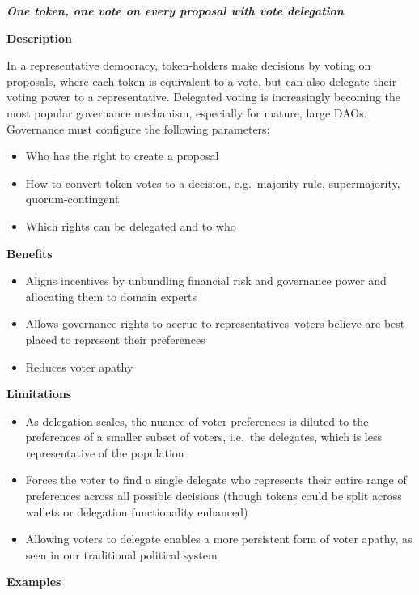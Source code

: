 \documentclass[
]{article}
\providecommand{\tightlist}{%
  \setlength{\itemsep}{0pt}\setlength{\parskip}{0pt}}
\begin{document}
\textbf{\emph{One token, one vote on every proposal with vote
delegation}}

\textbf{Description}

In a representative democracy, token-holders make decisions by voting on
proposals, where each token is equivalent to a vote, but can also
delegate their voting power to a representative. Delegated voting is
increasingly becoming the most popular governance mechanism, especially
for mature, large DAOs. Governance must configure the following
parameters:

\begin{itemize}
\tightlist
\item
  Who has the right to create a proposal
\item
  How to convert token votes to a decision, e.g.~majority-rule,
  supermajority, quorum-contingent
\item
  Which rights can be delegated and to who
\end{itemize}

\textbf{Benefits}

\begin{itemize}
\tightlist
\item
  Aligns incentives by unbundling financial risk and governance power
  and allocating them to domain experts
\item
  Allows governance rights to accrue to representatives~voters believe
  are best placed to represent their preferences
\item
  Reduces voter apathy
\end{itemize}

\textbf{Limitations}

\begin{itemize}
\tightlist
\item
  As delegation scales, the nuance of voter preferences is diluted to
  the preferences of a smaller subset of voters, i.e.~the delegates,
  which is less representative of the population
\item
  Forces the voter to find a single delegate who represents their entire
  range of preferences across all possible decisions (though tokens
  could be split across wallets or delegation functionality enhanced)
\item
  Allowing voters to delegate enables a more persistent form of voter
  apathy, as seen in our traditional political system
\end{itemize}

\textbf{Examples}
\end{document}
